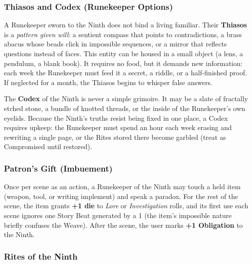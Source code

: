 \subsubsection*{Thiasos and Codex (Runekeeper Options)}

A Runekeeper sworn to the Ninth does not bind a living familiar. Their \textbf{Thiasos} is a \textit{pattern given will}: a sentient compass that points to contradictions, a brass abacus whose beads click in impossible sequences, or a mirror that reflects questions instead of faces. This entity can be housed in a small object (a lens, a pendulum, a blank book). It requires no food, but it demands new information: each week the Runekeeper must feed it a secret, a riddle, or a half-finished proof. If neglected for a month, the Thiasos begins to whisper false answers.

The \textbf{Codex} of the Ninth is never a simple grimoire. It may be a slate of fractally etched stone, a bundle of knotted threads, or the inside of the Runekeeper's own eyelids. Because the Ninth's truths resist being fixed in one place, a Codex requires upkeep: the Runekeeper must spend an hour each week erasing and rewriting a single page, or the Rites stored there become garbled (treat as Compromised until restored).

\subsubsection*{Patron's Gift (Imbuement)}

Once per scene as an action, a Runekeeper of the Ninth may touch a held item (weapon, tool, or writing implement) and speak a paradox. For the rest of the scene, the item grants \textbf{+1 die} to \textit{Lore} or \textit{Investigation} rolls, and its first use each scene ignores one Story Beat generated by a 1 (the item's impossible nature briefly confuses the Weave). After the scene, the user marks \textbf{+1 Obligation} to the Ninth.

\subsubsection*{Rites of the Ninth}

